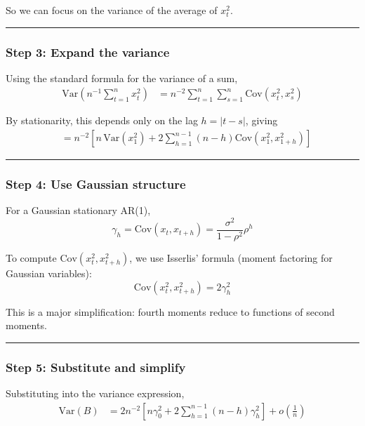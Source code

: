 \documentclass[11pt]{article}
\begin{document}
So we can focus on the variance of the average of \(x_t^2\).

\begin{center}\rule{0.5\linewidth}{0.5pt}\end{center}

\subsubsection{Step 3: Expand the
variance}\label{step-3-expand-the-variance}

Using the standard formula for the variance of a sum, \[
\begin{aligned}
\text{Var}\!\left(n^{-1}\sum_{t=1}^n x_t^2\right)
&= n^{-2}\sum_{t=1}^n\sum_{s=1}^n \text{Cov}(x_t^2,x_s^2)
\end{aligned}
\]

By stationarity, this depends only on the lag \(h = |t-s|\), giving \[
\begin{aligned}
&= n^{-2}\left[n\,\text{Var}(x_1^2)+2\sum_{h=1}^{n-1}(n-h)\text{Cov}(x_1^2,x_{1+h}^2)\right]
\end{aligned}
\]

\begin{center}\rule{0.5\linewidth}{0.5pt}\end{center}

\subsubsection{Step 4: Use Gaussian
structure}\label{step-4-use-gaussian-structure}

For a Gaussian stationary AR(1), \[
\gamma_h=\text{Cov}(x_t,x_{t+h})=\frac{\sigma^2}{1-\rho^2}\rho^h
\]

To compute \(\text{Cov}(x_t^2,x_{t+h}^2)\), we use Isserlis' formula
(moment factoring for Gaussian variables): \[
\text{Cov}(x_t^2,x_{t+h}^2)=2\gamma_h^2
\]

This is a major simplification: fourth moments reduce to functions of
second moments.

\begin{center}\rule{0.5\linewidth}{0.5pt}\end{center}

\subsubsection{Step 5: Substitute and
simplify}\label{step-5-substitute-and-simplify}

Substituting into the variance expression, \[
\begin{aligned}
\text{Var}(B)
&= 2n^{-2}\left[n\gamma_0^2+2\sum_{h=1}^{n-1}(n-h)\gamma_h^2\right]+o\!\left(\frac{1}{n}\right)
\end{aligned}
\]
\end{document}
